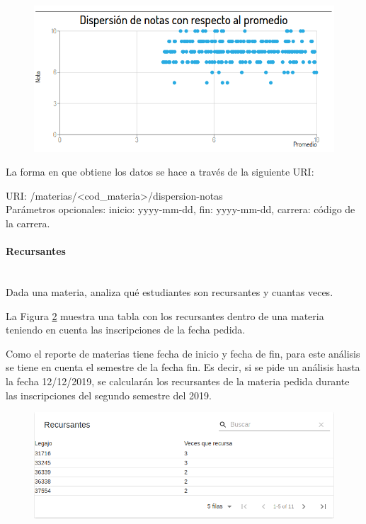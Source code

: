 \begin{figure}[H]
  \centering
    \includegraphics[scale=0.4]{images/seguimiento-academico/sa-dispersion-notas.png}
  \label{fig:sa-dispersion-notas}
\end{figure}

La forma en que obtiene los datos se hace a través de la siguiente URI:

URI: /materias/<cod\_materia>/dispersion-notas \\

Parámetros opcionales: inicio: yyyy-mm-dd, fin: yyyy-mm-dd, carrera: código de la carrera. \\


\paragraph{Recursantes}\mbox{}\\

Dada una materia, analiza qué estudiantes son recursantes y cuantas veces.

La Figura \ref{fig:sa-recursantes} muestra una tabla con los recursantes dentro de una materia teniendo en cuenta las inscripciones de la fecha pedida.

Como el reporte de materias tiene fecha de inicio y fecha de fin, para este análisis se tiene en cuenta el semestre de la fecha fin. Es decir, si se pide un análisis hasta la fecha 12/12/2019, se calcularán los recursantes de la materia pedida durante las inscripciones del segundo semestre del 2019.

\begin{figure}[H]
  \centering
    \includegraphics[scale=0.4]{images/seguimiento-academico/sa-recursantes.png}
  \label{fig:sa-recursantes}
\end{figure}

